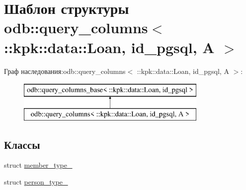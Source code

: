 \hypertarget{structodb_1_1query__columns_3_01_1_1kpk_1_1data_1_1_loan_00_01id__pgsql_00_01_a_01_4}{}\section{Шаблон структуры odb\+:\+:query\+\_\+columns$<$ \+:\+:kpk\+:\+:data\+:\+:Loan, id\+\_\+pgsql, A $>$}
\label{structodb_1_1query__columns_3_01_1_1kpk_1_1data_1_1_loan_00_01id__pgsql_00_01_a_01_4}
Граф наследования\+:odb\+:\+:query\+\_\+columns$<$ \+:\+:kpk\+:\+:data\+:\+:Loan, id\+\_\+pgsql, A $>$\+:\begin{figure}[H]
\begin{center}
\leavevmode
\includegraphics[height=2.000000cm]{structodb_1_1query__columns_3_01_1_1kpk_1_1data_1_1_loan_00_01id__pgsql_00_01_a_01_4}
\end{center}
\end{figure}
\subsection*{Классы}
\begin{DoxyCompactItemize}
\item 
struct \hyperlink{structodb_1_1query__columns_3_01_1_1kpk_1_1data_1_1_loan_00_01id__pgsql_00_01_a_01_4_1_1member__type__}{member\+\_\+type\+\_\+}
\item 
struct \hyperlink{structodb_1_1query__columns_3_01_1_1kpk_1_1data_1_1_loan_00_01id__pgsql_00_01_a_01_4_1_1person__type__}{person\+\_\+type\+\_\+}
\end{DoxyCompactItemize}
